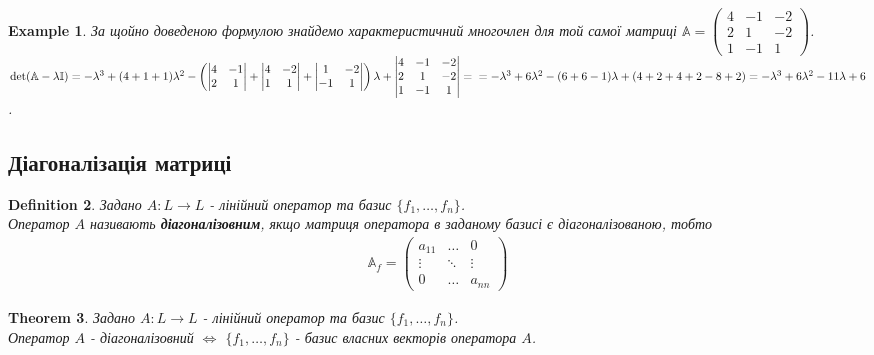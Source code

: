 \documentclass[a4paper, 10pt]{article}
\theoremstyle{theoremdd}
\newtheorem{theorem}{Theorem}[subsection]
\theoremstyle{theoremdd}
\newtheorem{definition}[theorem]{Definition}
\theoremstyle{theoremdd}
\theoremstyle{theoremdd}
\newtheorem{example}[theorem]{Example}
\theoremstyle{theoremdd}
\theoremstyle{theoremdd}
\theoremstyle{theoremdd}
\theoremstyle{theoremdd}
\begin{document}
\begin{example}
За щойно доведеною формулою знайдемо характеристичний многочлен для той самої матриці $\mathbb{A} = \begin{pmatrix}
4 & -1 & -2 \\
2 & 1 & -2 \\
1 & -1 & 1
\end{pmatrix}$.\\
$\det (\mathbb{A} - \lambda \mathbb{I}) = -\lambda^3 + (4+1+1)\lambda^2 - \left( \begin{vmatrix}
4 & -1 \\
2 & 1
\end{vmatrix} + \begin{vmatrix}
4 & -2 \\
1 & 1
\end{vmatrix} + \begin{vmatrix}
1 & -2 \\
-1 & 1
\end{vmatrix} \right) \lambda + \begin{vmatrix}
4 & -1 & -2 \\
2 & 1 & -2 \\
1 & -1 & 1
\end{vmatrix} = \\
=-\lambda^3 + 6\lambda^2 - (6+6-1)\lambda + (4+2+4+2-8+2) = -\lambda^3 + 6\lambda^2 -11\lambda + 6$.
\end{example}

\subsection{Діагоналізація матриці}
\begin{definition}
Задано $A: L \to L$ - лінійний оператор та базис $\{f_1,\dots,f_n\}$.\\
Оператор $A$ називають \textbf{діагоналізовним}, якщо матриця оператора в заданому базисі є діагоналізованою, тобто
\begin{align*}
\mathbb{A}_f = \begin{pmatrix}
a_{11} & \dots & 0 \\
\vdots & \ddots & \vdots \\
0 & \dots & a_{nn}
\end{pmatrix}
\end{align*}
\end{definition}

\begin{theorem}
Задано $A: L \to L$ - лінійний оператор та базис $\{f_1,\dots,f_n\}$.\\
Оператор $A$ - діагоналізовний $\iff$ $\{f_1,\dots,f_n\}$ - базис власних векторів оператора $A$.
\end{theorem}
\end{document}
